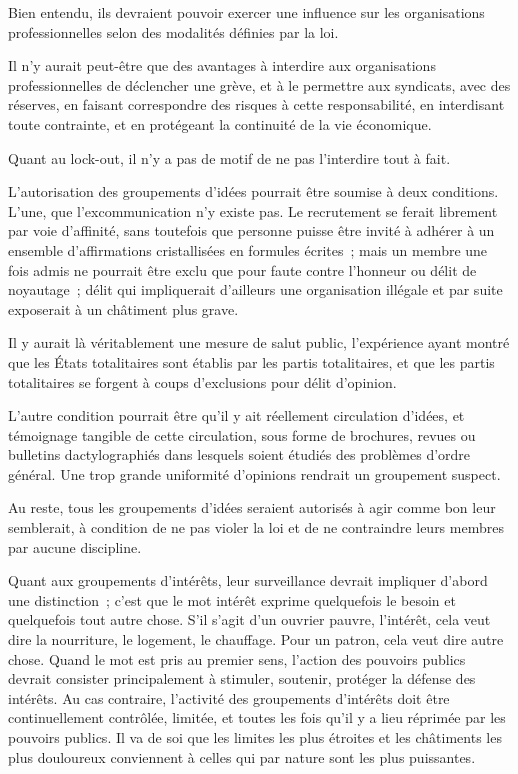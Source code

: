 \documentclass[french,twoside]{book} %
\begin{document}
\par
Bien entendu, ils devraient pouvoir exercer une influence sur les organisations professionnelles selon des modalités définies par la loi.\par
Il n'y aurait peut-être que des avantages à interdire aux organisations professionnelles de déclencher une grève, et à le permettre aux syndicats, avec des réserves, en faisant correspondre des risques à cette responsabilité, en interdisant toute contrainte, et en protégeant la continuité de la vie économique.\par
Quant au lock-out, il n'y a pas de motif de ne pas l'interdire tout à fait.\par
L'autorisation des groupements d'idées pourrait être soumise à deux conditions. L'une, que l'excommunication n'y existe pas. Le recrutement se ferait librement par voie d'affinité, sans toutefois que personne puisse être invité à adhérer à un ensemble d'affirmations cristallisées en formules écrites ; mais un membre une fois admis ne pourrait être exclu que pour faute contre l'honneur ou délit de noyautage ; délit qui impliquerait d'ailleurs une organisation illégale et par suite exposerait à un châtiment plus grave.\par
Il y aurait là véritablement une mesure de salut public, l'expérience ayant montré que les États totalitaires sont établis par les partis totalitaires, et que les partis totalitaires se forgent à coups d'exclusions pour délit d'opinion.\par
L'autre condition pourrait être qu'il y ait réellement circulation d'idées, et témoignage tangible de cette circulation, sous forme de brochures, revues ou bulletins dactylographiés dans lesquels soient étudiés des problèmes d'ordre général. Une trop grande uniformité d'opinions rendrait un groupement suspect.\par
Au reste, tous les groupements d'idées seraient autorisés à agir comme bon leur semblerait, à condition de ne pas violer la loi et de ne contraindre leurs membres par aucune discipline.\par
Quant aux groupements d'intérêts, leur surveillance devrait impliquer d'abord une distinction ; c'est que le mot intérêt exprime quelquefois le besoin et quelquefois tout autre chose. S'il s'agit d'un ouvrier pauvre, l'intérêt, cela veut dire la nourriture, le logement, le chauffage. Pour un patron, cela veut dire autre chose. Quand le mot est pris au premier sens, l'action des pouvoirs publics devrait consister principalement à stimuler, soutenir, protéger la défense des intérêts. Au cas contraire, l'activité des groupements d'intérêts doit être continuellement contrôlée, limitée, et toutes les fois qu'il y a lieu réprimée par les pouvoirs publics. Il va de soi que les limites les plus étroites et les châtiments les plus douloureux conviennent à celles qui par nature sont les plus puissantes.\par
\end{document}
